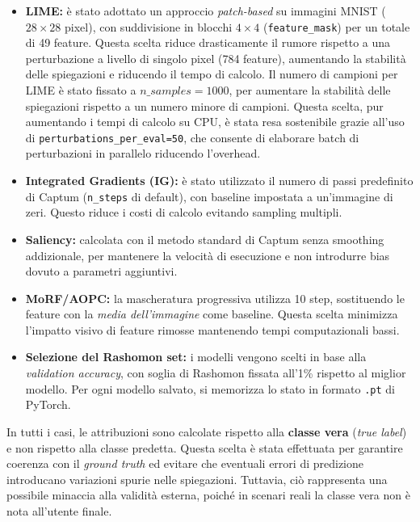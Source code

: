 \documentclass{article}
\begin{document}
\begin{itemize}
      \item \textbf{LIME:} è stato adottato un approccio \textit{patch-based} su immagini MNIST ($28\times28$ pixel), con suddivisione in blocchi $4\times4$ (\texttt{feature\_mask}) per un totale di 49 feature. Questa scelta riduce drasticamente il rumore rispetto a una perturbazione a livello di singolo pixel (784 feature), aumentando la stabilità delle spiegazioni e riducendo il tempo di calcolo. Il numero di campioni per LIME è stato fissato a $n\_samples = 1000$, per aumentare la stabilità delle spiegazioni rispetto a un numero minore di campioni. Questa scelta, pur aumentando i tempi di calcolo su CPU, è stata resa sostenibile grazie all’uso di \texttt{perturbations\_per\_eval=50}, che consente di elaborare batch di perturbazioni in parallelo riducendo l’overhead.

      \item \textbf{Integrated Gradients (IG):} è stato utilizzato il numero di passi predefinito di Captum (\texttt{n\_steps} di default), con baseline impostata a un’immagine di zeri. Questo riduce i costi di calcolo evitando sampling multipli.

      \item \textbf{Saliency:} calcolata con il metodo standard di Captum senza smoothing addizionale, per mantenere la velocità di esecuzione e non introdurre bias dovuto a parametri aggiuntivi.

      \item \textbf{MoRF/AOPC:} la mascheratura progressiva utilizza 10 step, sostituendo le feature con la \textit{media dell’immagine} come baseline. Questa scelta minimizza l’impatto visivo di feature rimosse mantenendo tempi computazionali bassi.

      \item \textbf{Selezione del Rashomon set:} i modelli vengono scelti in base alla \textit{validation accuracy}, con soglia di Rashomon fissata all’1\% rispetto al miglior modello. Per ogni modello salvato, si memorizza lo stato in formato \texttt{.pt} di PyTorch.
\end{itemize}

In tutti i casi, le attribuzioni sono calcolate rispetto alla \textbf{classe
      vera} (\textit{true label}) e non rispetto alla classe predetta. Questa scelta
è stata effettuata per garantire coerenza con il \textit{ground truth} ed
evitare che eventuali errori di predizione introducano variazioni spurie nelle
spiegazioni. Tuttavia, ciò rappresenta una possibile minaccia alla validità
esterna, poiché in scenari reali la classe vera non è nota all’utente finale.
\end{document}
